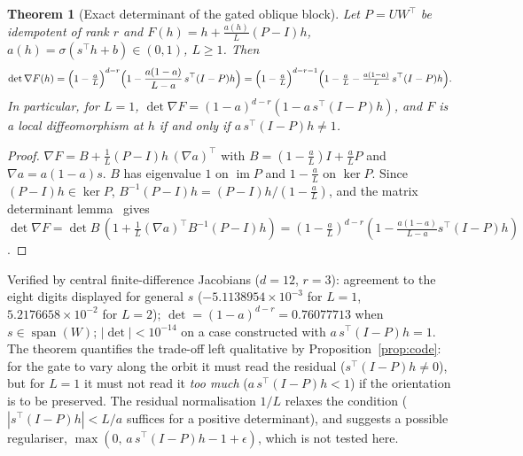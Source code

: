 \documentclass[11pt,a4paper]{article}
\theoremstyle{plain}
\newtheorem{theorem}{Theorem}
\theoremstyle{definition}
\theoremstyle{remark}
\newcommand{\im}{\operatorname{im}}
\newcommand{\spn}{\operatorname{span}}
\newcommand{\T}{\top}
\begin{document}
\begin{theorem}[Exact determinant of the gated oblique block]
\label{thm:gate-det}
Let $P=UW^\T$ be idempotent of rank $r$ and
$F(h)=h+\tfrac{a(h)}{L}(P-I)h$, $a(h)=\sigma(s^\T h+b)\in(0,1)$, $L\ge1$. Then
\begin{equation}
  \det\nabla F(h)=\Bigl(1-\tfrac aL\Bigr)^{d-r}\Bigl(1-\frac{a(1-a)}{L-a}\,s^\T(I-P)h\Bigr)
  =\Bigl(1-\tfrac aL\Bigr)^{d-r-1}\Bigl(1-\tfrac aL-\tfrac{a(1-a)}{L}\,s^\T(I-P)h\Bigr).
  \label{eq:det-gate}
\end{equation}
In particular, for $L=1$, $\det\nabla F=(1-a)^{d-r}(1-a\,s^\T(I-P)h)$, and $F$
is a local diffeomorphism at $h$ if and only if $a\,s^\T(I-P)h\neq1$.
\end{theorem}
\begin{proof}
$\nabla F=B+\tfrac1L(P-I)h\,(\nabla a)^\T$ with $B=(1-\tfrac aL)I+\tfrac aLP$
and $\nabla a=a(1-a)s$. $B$ has eigenvalue $1$ on $\im P$ and $1-\tfrac aL$ on
$\ker P$. Since $(P-I)h\in\ker P$, $B^{-1}(P-I)h=(P-I)h/(1-\tfrac aL)$, and
the matrix determinant lemma~\cite{hornjohnson2013} gives
$\det\nabla F=\det B\,(1+\tfrac1L(\nabla a)^\T B^{-1}(P-I)h)
=(1-\tfrac aL)^{d-r}(1-\tfrac{a(1-a)}{L-a}s^\T(I-P)h)$.
\end{proof}
Verified by central finite-difference Jacobians ($d=12$, $r=3$): agreement
to the eight digits displayed for general $s$ ($-5.1138954\times10^{-3}$ for
$L=1$, $5.2176658\times10^{-2}$ for $L=2$); $\det=(1-a)^{d-r}=0.76077713$
when $s\in\spn(W)$; $|\det|<10^{-14}$ on a case constructed with
$a\,s^\T(I-P)h=1$. The theorem quantifies the trade-off left qualitative by
Proposition~\ref{prop:code}: for the gate to vary along the orbit it must
read the residual ($s^\T(I-P)h\neq0$), but for $L=1$ it must not read it
\emph{too much} ($a\,s^\T(I-P)h<1$) if the orientation is to be preserved.
The residual normalisation $1/L$ relaxes the condition
($|s^\T(I-P)h|<L/a$ suffices for a positive determinant), and suggests a
possible regulariser, $\max(0,\,a\,s^\T(I-P)h-1+\epsilon)$, which is not
tested here.
\end{document}
